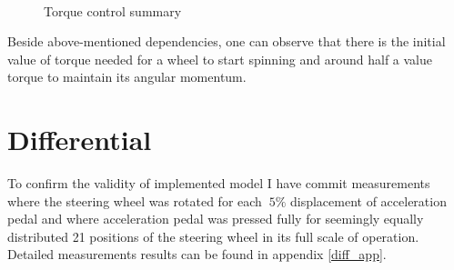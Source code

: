 \begin{figure}[h]
    \centering
        ~
        \caption{Torque control summary}
    \label{torq_ctl}
\end{figure}


Beside above-mentioned dependencies, one can observe that there is the initial value of torque needed for a wheel to start spinning and around half a value torque to maintain its angular momentum. 

\section{Differential}
To confirm the validity of implemented model I have commit measurements where the steering wheel was rotated for each $~5\%$ displacement of acceleration pedal and where acceleration pedal was pressed fully for seemingly equally distributed 21 positions of the steering wheel in its full scale of operation. Detailed measurements results can be found in appendix \ref{diff_app}.


